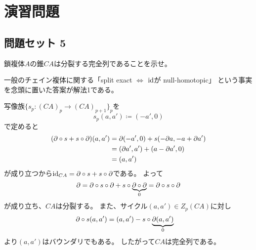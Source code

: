 \documentclass[report]{jlreq}
\begin{document}
%
\section{演習問題}

\subsection{問題セット 5}

\begin{problem}
    鎖複体$A$の錐$CA$は分裂する完全列であることを示せ。
\end{problem}

\begin{remark}
    一般のチェイン複体に関する「split exact $\iff$ $\mathrm{id}$が null-homotopic」
    という事実を念頭に置いた答案が解法1である。 
\end{remark}

\begin{answer}[解法 1.]
    写像族$\{ s_p \colon (CA)_p \to (CA)_{p + 1} \}_p$を
    \begin{equation}
        s_p (a, a') \coloneqq (-a', 0)
    \end{equation}
    で定めると
    \begin{alignat}{1}
        (\partial \circ s + s \circ \partial)(a, a')
            &= \partial (-a', 0) + s(- \partial a, - a + \partial a') \\
            &= (\partial a', a') + (a - \partial a', 0) \\
            &= (a, a')
    \end{alignat}
    が成り立つから$\mathrm{id}_{CA} = \partial \circ s + s \circ \partial$である。
    よって
    \begin{equation}
        \partial
            = \partial \circ s \circ \partial + s \circ \underbrace{\partial \circ \partial}_{0}
            = \partial \circ s \circ \partial
    \end{equation}
    が成り立ち、$CA$は分裂する。
    また、サイクル$(a, a') \in Z_p(CA)$に対し
    \begin{alignat}{1}
        \partial \circ s(a, a')
            &= (a, a') - s \circ \underbrace{\partial (a, a')}_{0}
    \end{alignat}
    より$(a, a')$はバウンダリでもある。
    したがって$CA$は完全列である。
\end{answer}
\end{document}

